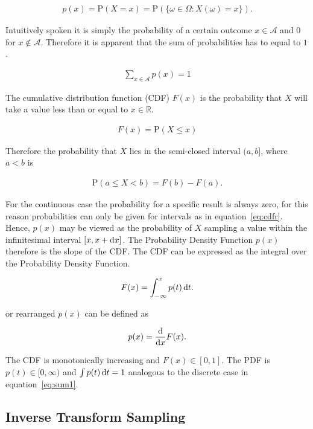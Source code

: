 \begin{align}
p(x) = \text{P}(X = x) = \text{P}( \{\omega \in \Omega : X(\omega) = x \} ).
\end{align}

Intuitively spoken it is simply the probability of a certain outcome $x \in \mathcal{A}$ and $0$ for $x \notin \mathcal{A}$. Therefore it is apparent that the sum of probabilities has to equal to $1$.

\begin{align}
\label{eq:sum1}
\sum_{x\in\mathcal{A}}p(x) = 1
\end{align}

The cumulative distribution function (CDF) $F(x)$ is the probability that $X$ will take a value less than or equal to $x \in \mathbb{R}$.

\begin{align}
 F(x) = \text{P}(X \leq x)
\end{align}

Therefore the probability that $X$ lies in the semi-closed interval $(a, b]$, where $a < b$ is  

\begin{align}
\label{eq:cdfr}
 \text{P}(a \leq X < b) = F(b) - F(a).
\end{align}

For the continuous case the probability for a specific result is always zero, for this reason probabilities can only be given for intervals as in equation~\ref{eq:cdfr}. Hence, $p(x)$ may be viewed as the probability of $X$ sampling a value within the infinitesimal interval $[x, x + \mathop{}\!\mathrm{d} x]$. The Probability Density Function $p(x)$ therefore is the slope of the CDF. The CDF can be expressed as the integral over the Probability Density Function.

\begin{align}
\label{eq:cdfc}
 F(x) = \int_{-\infty}^{x}p(t)\mathop{}\!\mathrm{d} t.
\end{align}

or rearranged $p(x)$ can be defined as

\begin{align}
 p(x) = \frac{\mathop{}\!\mathrm{d}}{\mathop{}\!\mathrm{d} x} F(x).
\end{align}

The CDF is monotonically increasing and $F(x) \in [0,1]$. The PDF is $p(t) \in [0, \infty)$ and $\int p(t)\mathop{}\!\mathrm{d} t = 1$ analogous to the discrete case in equation~\ref{eq:sum1}. 

\subsection{Inverse Transform Sampling}

